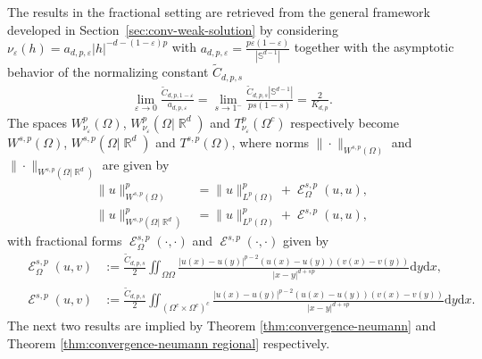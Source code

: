 \documentclass[12pt, reqno]{amsart}%
\theoremstyle{plain}  %
\theoremstyle{definition}  %
\numberwithin{equation}{section}
\DeclareMathOperator{\cE}{\mathcal{E}}
\DeclareMathOperator{\R}{\mathbb{R}}
\newcommand{\iil}{\iint}
\renewcommand{\d}{\mathrm{d}}
\newcommand{\eps}{\varepsilon}
\newcommand{\WnuOmRa}{W^p_{\nu_\eps}(\Omega|\R^d )}
\newcommand{\TnuOma}{T^p_{\nu_\eps} (\Omega^c)}
\newcommand{\WnuOma}{W^{p}_{\nu_\eps}(\Omega)}
\begin{document}
\noindent The results in the fractional setting are retrieved from the general framework developed in Section~\ref{sec:conv-weak-solution} by considering $\nu_\varepsilon(h)=a_{d,p,\eps}|h|^{-d-(1-\eps)p}$ with $a_{d,p,\eps}=\frac{p\eps(1-\eps)}{|\mathbb{S}^{d-1}|}$
together with the asymptotic behavior of the normalizing constant $\widetilde{C}_{d,p,s}$
\begin{align*}
\lim_{\eps\to0}\frac{\widetilde{C}_{d,p,1-\eps}}{a_{d,p,\eps}}
= \lim_{s\to1^-}
\frac{\widetilde{C}_{d,p,s}|\mathbb{S}^{d-1}|}{ps(1-s)}
=\frac{2}{K_{d,p}}.
\end{align*}
\noindent The spaces $\WnuOma$, $ \WnuOmRa$ and $\TnuOma$ respectively become $W^{s,p}(\Omega)$, $W^{s,p}(\Omega|\R^d)$ and $T^{s,p}(\Omega)$, where  norms $\|\cdot\|_{W^{s,p}(\Omega)}$ and 	$\|\cdot\|_{W^{s,p}(\Omega|\R^d)}$ are given by
\begin{align*}
\|u\|^p_{W^{s,p}(\Omega)}
&=  \|u\|^p_{L^p(\Omega)}+ \cE^{s,p}_\Omega(u,u),
\\
\|u\|^p_{W^{s,p}(\Omega|\R^d)}
&=  \|u\|^p_{L^p(\Omega)}+ \cE^{s,p}(u,u),
\end{align*}
with fractional forms $ \cE^{s,p}_\Omega(\cdot,\cdot)$ and $ \cE^{s,p}(\cdot,\cdot)$ given by
 \begin{align*}
\quad \cE^{s,p}_\Omega(u,v)
&:=\frac{\widetilde{C}_{d,p,s}}{2}\iil_{ \Omega \Omega} \frac{|u(x)-u(y)|^{p-2}(u(x)-u(y))(v(x)-v(y))}{|x-y|^{d+sp}}\d y\d x,\\
\quad \cE^{s,p}(u,v) &:=\frac{\widetilde{C}_{d,p,s}}{2} \iil_{( \Omega^c\times \Omega^c)^c} \frac{|u(x)-u(y)|^{p-2}(u(x)-u(y))(v(x)-v(y))}{|x-y|^{d+sp}}\d y \d x.
\end{align*}
The next two results are implied by Theorem \ref{thm:convergence-neumann} and Theorem \ref{thm:convergence-neumann regional} respectively.
\end{document}
